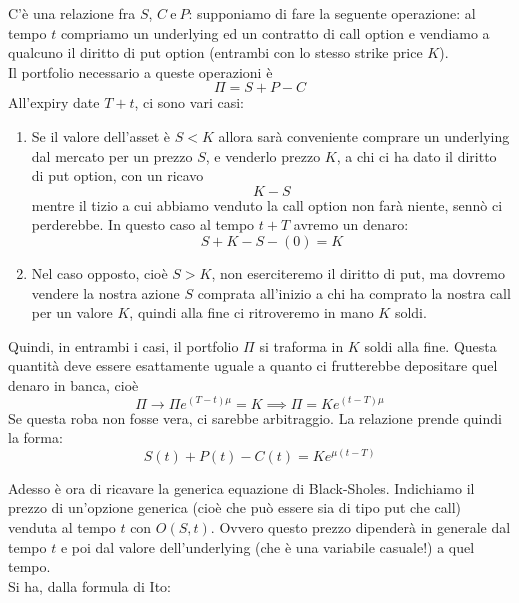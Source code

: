 \documentclass[a4paper,12pt]{article}
\theoremstyle{plain}
\theoremstyle{definition}
\newcommand{\econg}{~\text{e}~}
\theoremstyle{remark}
\begin{document}
C'è una relazione fra $S$, $C\econg P$:
supponiamo di fare la seguente operazione: al tempo $t$ compriamo un underlying ed un contratto di call option e vendiamo a qualcuno il diritto di put option (entrambi con lo stesso strike price $K$).
\\Il portfolio necessario a queste operazioni è
\[\Pi=S+P-C	\]
All'expiry date $T+t$, ci sono vari casi:
\begin{enumerate}
	\item Se il valore dell'asset è $S<K$ allora sarà conveniente comprare un underlying dal mercato per un prezzo $S$, e venderlo  prezzo $K$, a chi ci ha dato il diritto di put option, con un ricavo \[K-S\] mentre il tizio a cui abbiamo venduto la call option non farà niente, sennò ci perderebbe. In questo caso al tempo $t+T$ avremo un denaro:
	\[S+K-S-(0)=K\]
	\item Nel caso opposto, cioè $S>K$, non eserciteremo il diritto di put, ma dovremo vendere la nostra azione $S$ comprata all'inizio a chi ha comprato la nostra call per un valore $K$, quindi alla fine ci ritroveremo in mano $K$ soldi.
\end{enumerate}
Quindi, in entrambi i casi, il portfolio $\Pi$ si traforma in $K$ soldi alla fine. Questa quantità deve essere esattamente uguale a quanto ci frutterebbe depositare quel denaro in banca, cioè 
\[\Pi\rightarrow\Pi e^{(T-t)\mu}=K\implies \Pi=Ke^{(t-T)\mu}	\]
Se questa roba non fosse vera, ci sarebbe arbitraggio. La relazione prende quindi la forma:
\[S(t)+P(t)-C(t)=K e^{\mu(t-T)}	\]

Adesso è ora di ricavare la generica equazione di Black-Sholes. Indichiamo il prezzo di un'opzione generica (cioè che può essere sia di tipo put che call) venduta al tempo $t$ con $O(S,t)$. Ovvero questo prezzo dipenderà in generale dal tempo $t$ e poi dal valore dell'underlying (che è una variabile casuale!) a quel tempo.
\\Si ha, dalla formula di Ito:
\end{document}
